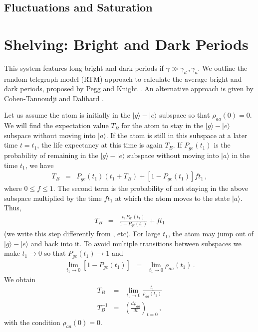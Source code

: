 \documentclass[twocolumn,aps,eqsecnum,showkeys,amsmath]{revtex4-2}
\begin{document}
\subsection{Fluctuations and Saturation}

\section{Shelving: Bright and Dark Periods} 
This system features long bright and dark periods if 
$\gamma \gg \gamma_d\,, \gamma_a$. We outline the random telegraph 
model (RTM) approach to calculate the average bright and dark periods,  
proposed by Pegg and Knight \cite{PeKn88a,PeKn88b,EvKe02}. An 
alternative approach is given by Cohen-Tannoudji and Dalibard  
\cite{CTDal86}.  

Let us assume the atom is initially in the $| g \rangle - | e \rangle$ subspace 
so that $\rho_{aa}(0)=0$. We will find the expectation value $T_B$ for the 
atom to stay in the $| g \rangle - | e \rangle$ subspace without moving into 
$| a \rangle$. If the atom is still in this subspace at a later time $t=t_1$, the 
life expectancy at this time is again $T_B$. If $P_{ge}(t_1)$ is the probability 
of remaining in the $| g \rangle - | e \rangle$ subspace without moving into 
$| a \rangle$ in the time $t_1$, we have  
%
\begin{eqnarray}
T_B &=& P_{ge}(t_1) (t_1+ T_B) +[1- P_{ge}(t_1)] f t_1 \,, 
\end{eqnarray}
where $0 \leq f \leq 1$. The second term is the probability of not staying 
in the above subspace multiplied by the time $f t_1$ at which the atom 
moves to the state $| a \rangle$. Thus, 
%
\begin{eqnarray}
T_B &=& \frac{t_1 P_{ge}(t_1)}{ 1- P_{ge}(t_1) } +f t_1  
\end{eqnarray}
(we write this step differently from \cite{PeKn88a,PeKn88b,EvKe02}, etc). 
For large $t_1$, the atom may jump out of $| g \rangle - | e \rangle$ and 
back into it. To avoid multiple transitions between subspaces we make 
$t_1 \to 0$ so that $P_{ge} (t_1) \to 1$ and 
%
\begin{eqnarray}
\lim_{t_1 \to 0} [1- P_{ge} (t_1)] &=& \lim_{t_1 \to 0} \rho_{aa} (t_1) \,.
\end{eqnarray}
We obtain 
%
\begin{eqnarray}
T_B &=& \lim_{t_1 \to 0} \frac{t_1}{\rho_{aa} (t_1)}  	\\ 
T_B^{-1} &=& \left( \frac{ d \rho_{aa} }{dt} \right)_{t=0} \,,
\end{eqnarray}
with the condition $\rho_{aa}(0) =0$. 
\end{document}
